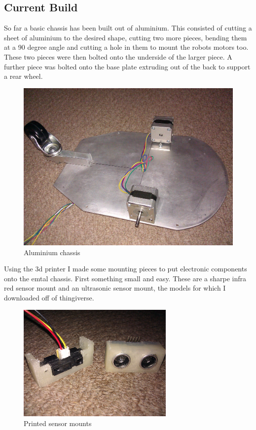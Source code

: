 \documentclass[11pt,fleqn,twoside]{article}
\begin{document}
\subsection{Current Build}
So far a basic chassis has been built out of aluminium.  This consisted of cutting a sheet of aluminium to the desired shape, cutting two more pieces, bending them at a 90 degree angle and cutting a hole in them to mount the robots motors too.  These two pieces were then bolted onto the underside of the larger piece.  A further piece was bolted onto the base plate extruding out of the back to support a rear wheel.
\begin{figure}[h]
\centering
        \includegraphics[width=5.0in] {figures/aluminium-chassis.jpg}
        \caption{Aluminium chassis}
        \label{Aluminium chassis}
\end{figure}

Using the 3d printer I made some mounting pieces to put electronic components onto the emtal chassis.  First something small and easy.  These are a sharpe infra red sensor mount and an ultrasonic sensor mount, the models for which I downloaded off of thingiverse.
\begin{figure}[h]
\centering
        \includegraphics[width=3.0in] {figures/printed-sensor-mounts.jpg}
        \caption{Printed sensor mounts}
        \label{Printed sensor mounts}
\end{figure}
\end{document}

